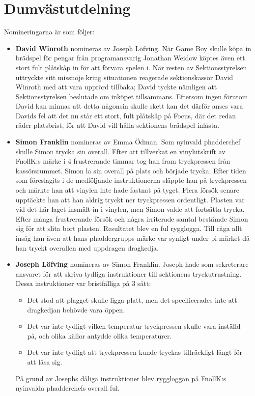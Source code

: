 \documentclass[hidelinks]{sektionsmote}
\begin{document}
\section{Dumvästutdelning}
Nomineringarna är som följer:
\begin{itemize}
  \item \textbf{David Winroth} nomineras av Joseph Löfving.\newline
  När Game Boy skulle köpa in brädspel för pengar från programansvarig Jonathan Weidow köptes även ett stort fult plåtskåp in för att förvara spelen i.
  När resten av Sektionsstyrelsen uttryckte sitt missnöje kring situationen reagerade sektionskassör David Winroth med att vara upprörd tillbaka; David tyckte nämligen att Sektionsstyrelsen beslutade om inköpet tillsammans.
  Eftersom ingen förutom David kan minnas att detta någonsin skulle skett kan det därför anses vara Davids fel att det nu står ett stort, fult plåtskåp på Focus, där det redan råder platsbrist, för att David vill hålla sektionens brädspel inlåsta.

  \item \textbf{Simon Franklin} nomineras av Emma Ödman.\newline
  Som nyinvald phadderchef skulle Simon trycka sin overall.
  Efter att tillverkat en vinylutskrift av FnollK:s märke i 4 frustrerande timmar tog han fram tryckpressen från kassörsrummet.
  Simon la sin overall på plats och började trycka.
  Efter tiden som föreslagits i de medföljande instruktionerna släppte han på tryckpressen och märkte han att vinylen inte hade fastnat på tyget.
  Flera försök senare upptäckte han att han aldrig tryckt ner tryckpressen ordentligt.
  Plasten var vid det här laget insmält in i vinylen, men Simon valde att fortsätta trycka.
  Efter många frustrerande försök och några irriterade samtal bestämde Simon sig för att slita bort plasten.
  Resultatet blev en ful rygglogga.
  Till råga allt insåg han även att hans phaddergrupps-märke var synligt under pi-märket då han tryckt overallen med uppdragen dragkedja.

  \item \textbf{Joseph Löfving} nomineras av Simon Franklin.\newline
  Joseph hade som sekreterare ansvaret för att skriva tydliga instruktioner till sektionens tryckutrustning.
  Dessa instruktioner var bristfälliga på 3 sätt:
  \begin{itemize}
    \item Det stod att plagget skulle ligga platt, men det specificerades inte att dragkedjan behövde vara öppen.
    \item Det var inte tydligt vilken temperatur tryckpressen skulle vara inställd på, och olika källor antydde olika temperaturer.
    \item Det var inte tydligt att tryckpressen kunde tryckas tillräckligt långt för att låsa sig.
  \end{itemize}
  På grund av Josephs dåliga instruktioner blev ryggloggan på FnollK:s nyinvalda phadderchefs overall ful.


\end{itemize}
\end{document}
